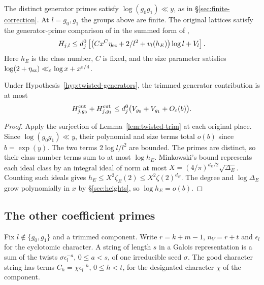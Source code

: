 \begin{hypothesis}[\openinput]\label{hyp:twisted-generators}
The distinct generator primes satisfy $\log(g_0g_1)\ll y$, as in
\S\ref{sec:finite-correction}. At $l=g_0,g_1$ the groups above are finite.
The original lattices satisfy
the generator-prime comparison of \citep[Hypothesis~17.36]{adriazola-grh}
in the summed form of \citep[\S3]{kimi-generator},
\[
 H_{j,l}\le d_j^0\left[
  \bigl(Cx^C\eta_{\rm sz}+2/l^2+v_l(h_E)\bigr)\log l+V_l\right].
\]
Here $h_E$ is the class number, $C$ is fixed, and the size parameter
satisfies $\log(2+\eta_{\rm sz})\ll_\varepsilon \log x+x^{\varepsilon/4}$.
\end{hypothesis}

\begin{proposition}\label{prop:twisted-generators}
Under Hypothesis~\ref{hyp:twisted-generators}, the trimmed generator
contribution is at most
\[
 H_{j,g_0}^{\rm cut}+H_{j,g_1}^{\rm cut}
       \le d_j^0\bigl(V_{g_0}+V_{g_1}+O_\varepsilon(b)\bigr).
\]
\end{proposition}

\begin{proof}
Apply the surjection of Lemma~\ref{lem:twisted-trim} at each original
place. Since $\log(g_0g_1)\ll y$, their polynomial and size terms total
$o(b)$ since $b=\exp(y)$. The two terms $2\log l/l^2$ are bounded.
The primes are distinct, so their class-number terms sum to at most
$\log h_E$.
Minkowski's bound represents each ideal class by an integral ideal
of norm at most $X=(4/\pi)^{d_E/2}\sqrt{\Delta_E}$. Counting such ideals
gives $h_E\le X^2\zeta_E(2)\le X^2\zeta(2)^{d_E}$.
The degree and $\log\Delta_E$ grow polynomially in $x$ by
\S\ref{sec:heights}, so $\log h_E=o(b)$.
\end{proof}

\subsection{The other coefficient primes}

Fix $l\notin\{g_0,g_1\}$ and a trimmed component. Write $r=k+m-1$,
$n_V=r+t$ and $\epsilon_l$ for the cyclotomic character. A string of
length $s$ in a Galois representation is a sum of the twists
$\sigma\epsilon_l^{-a}$, $0\le a<s$, of one irreducible seed $\sigma$.
The good character string has terms $C_h=\chi\epsilon_l^{-h}$,
$0\le h<t$, for the designated character $\chi$ of the component.

